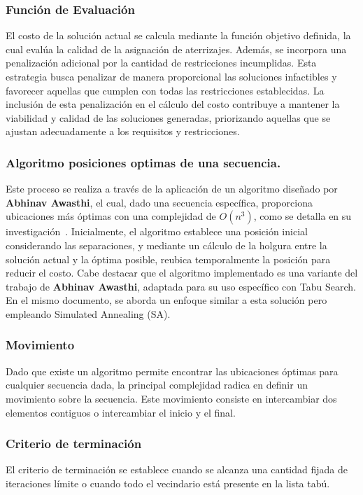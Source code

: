 \documentclass[letter, 10pt]{article}
\begin{document}
\subsubsection{Funci\'on de Evaluaci\'on}
El costo de la soluci\'on actual se calcula mediante la funci\'on objetivo definida, la cual eval\'ua la calidad de la asignaci\'on de aterrizajes. Adem\'as, se incorpora una penalizaci\'on adicional por la cantidad de restricciones incumplidas. Esta estrategia busca penalizar de manera proporcional las soluciones infactibles y favorecer aquellas que cumplen con todas las restricciones establecidas. La inclusi\'on de esta penalizaci\'on en el c\'alculo del costo contribuye a mantener la viabilidad y calidad de las soluciones generadas, priorizando aquellas que se ajustan adecuadamente a los requisitos y restricciones.


\subsubsection{Algoritmo posiciones optimas de una secuencia.}
Este proceso se realiza a trav\'es de la aplicaci\'on de un algoritmo dise\~{n}ado por \textbf{Abhinav Awasthi}, el cual, dado una secuencia espec\'ifica, proporciona ubicaciones m\'as \'optimas con una complejidad de $O(n^3)$, como se detalla en su investigaci\'on~\cite{awasthi2013aircraft}. Inicialmente, el algoritmo establece una posici\'on inicial considerando las separaciones, y mediante un c\'alculo de la holgura entre la soluci\'on actual y la \'optima posible, reubica temporalmente la posici\'on para reducir el costo. Cabe destacar que el algoritmo implementado es una variante del trabajo de \textbf{Abhinav Awasthi}, adaptada para su uso espec\'ifico con Tabu Search. En el mismo documento, se aborda un enfoque similar a esta soluci\'on pero empleando Simulated Annealing (SA).

\subsubsection{Movimiento}
Dado que existe un algoritmo permite encontrar las ubicaciones \'optimas para cualquier secuencia dada, la principal complejidad radica en definir un movimiento sobre la secuencia. Este movimiento consiste en intercambiar dos elementos contiguos o intercambiar el inicio y el final.

\subsubsection{Criterio de terminaci\'on}
El criterio de terminaci\'on se establece cuando se alcanza una cantidad fijada de iteraciones l\'imite o cuando todo el vecindario est\'a presente en la lista tab\'u.
\end{document}

